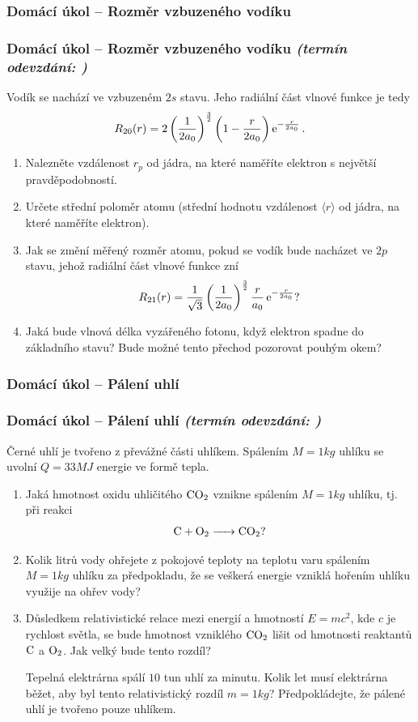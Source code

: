 \documentclass[a4paper,11pt,twoside]{article}
\newenvironment{homework}{}{}
\newcommand{\np}{\clearpage\newpage}
\newcommand{\exercise}[2][]{\ifthenelse{\isempty{#1}}
	{\np\thispagestyle{empty}\subsubsection*{Domácí úkol -- #2}}
	{\np\thispagestyle{empty}\np\subsubsection*{Domácí úkol -- #2 \small{\it{(termín odevzdání: {#1})}}}}
}
\begin{document}
\begin{homework}
	\exercise{Rozměr vzbuzeného vodíku}
		Vodík se nachází ve vzbuzeném $2s$ stavu.
		Jeho radiální část vlnové funkce je tedy
		\begin{equation*}
			R_{20}(r)=2\left(\frac{1}{2a_{0}}\right)^{\frac{3}{2}}\left(1-\frac{r}{2a_{0}}\right)\operatorname{e}^{-\frac{r}{2a_0}}.
		\end{equation*}

		\begin{enumerate}
			\item
				Nalezněte vzdálenost $r_{p}$ od jádra, na které naměříte elektron s největší pravděpodobností.
			\item
				Určete střední poloměr atomu (střední hodnotu vzdálenost $\langle r\rangle$ od jádra, na které naměříte elektron).
			\item
				Jak se změní měřený rozměr atomu, pokud se vodík bude nacházet ve $2p$ stavu, jehož radiální část vlnové funkce zní
				\begin{equation*}
					R_{21}(r)=\frac{1}{\sqrt{3}}\left(\frac{1}{2a_{0}}\right)^{\frac{3}{2}}\frac{r}{a_{0}}\operatorname{e}^{-\frac{r}{2a_{0}}}?
				\end{equation*}
			\item
				Jaká bude vlnová délka vyzářeného fotonu, když elektron spadne do základního stavu?
				Bude možné tento přechod pozorovat pouhým okem?
		\end{enumerate}

		\newpage
\end{homework}

\begin{homework}
	\exercise{Pálení uhlí}
		Černé uhlí je tvořeno z převážné části uhlíkem. Spálením $M=1\unit{kg}$ uhlíku se uvolní $Q=33\unit{MJ}$ energie ve formě tepla.
		\begin{enumerate}
			\item 
				Jaká hmotnost oxidu uhličitého $\ce{CO2}$ vznikne spálením $M=1\unit{kg}$ uhlíku, tj. při reakci
				\begin{equation*}
					\ce{C + O2 -> CO2}?
				\end{equation*}

			\item
				Kolik litrů vody ohřejete z pokojové teploty na teplotu varu spálením $M=1\unit{kg}$ uhlíku za předpokladu, že se veškerá energie vzniklá hořením uhlíku využije na ohřev vody?

			\item
				Důsledkem relativistické relace mezi energií a hmotností $E=mc^{2}$, kde $c$ je rychlost světla, se bude hmotnost vzniklého $\ce{CO2}$ lišit od hmotnosti reaktantů $\ce{C}$ a $\ce{O2}$.
				Jak velký bude tento rozdíl?

				Tepelná elektrárna spálí $10$ tun uhlí za minutu.
				Kolik let musí elektrárna běžet, aby byl tento relativistický rozdíl $m=1\unit{kg}$?
				Předpokládejte, že pálené uhlí je tvořeno pouze uhlíkem.
		\end{enumerate}

		\newpage
\end{homework}
\end{document}
